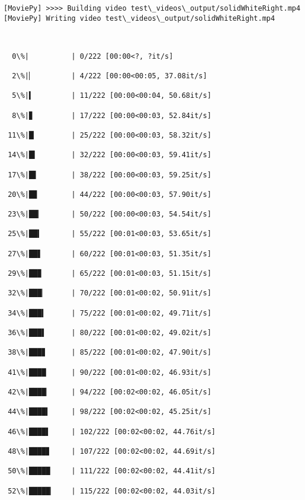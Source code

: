 \documentclass[11pt]{article}
\begin{document}
    \begin{Verbatim}[commandchars=\\\{\}]
[MoviePy] >>>> Building video test\_videos\_output/solidWhiteRight.mp4
[MoviePy] Writing video test\_videos\_output/solidWhiteRight.mp4

    \end{Verbatim}

    \begin{Verbatim}[commandchars=\\\{\}]


  0\%|          | 0/222 [00:00<?, ?it/s]

  2\%|▏         | 4/222 [00:00<00:05, 37.08it/s]

  5\%|▍         | 11/222 [00:00<00:04, 50.68it/s]

  8\%|▊         | 17/222 [00:00<00:03, 52.84it/s]

 11\%|█▏        | 25/222 [00:00<00:03, 58.32it/s]

 14\%|█▍        | 32/222 [00:00<00:03, 59.41it/s]

 17\%|█▋        | 38/222 [00:00<00:03, 59.25it/s]

 20\%|█▉        | 44/222 [00:00<00:03, 57.90it/s]

 23\%|██▎       | 50/222 [00:00<00:03, 54.54it/s]

 25\%|██▍       | 55/222 [00:01<00:03, 53.65it/s]

 27\%|██▋       | 60/222 [00:01<00:03, 51.35it/s]

 29\%|██▉       | 65/222 [00:01<00:03, 51.15it/s]

 32\%|███▏      | 70/222 [00:01<00:02, 50.91it/s]

 34\%|███▍      | 75/222 [00:01<00:02, 49.71it/s]

 36\%|███▌      | 80/222 [00:01<00:02, 49.02it/s]

 38\%|███▊      | 85/222 [00:01<00:02, 47.90it/s]

 41\%|████      | 90/222 [00:01<00:02, 46.93it/s]

 42\%|████▏     | 94/222 [00:02<00:02, 46.05it/s]

 44\%|████▍     | 98/222 [00:02<00:02, 45.25it/s]

 46\%|████▌     | 102/222 [00:02<00:02, 44.76it/s]

 48\%|████▊     | 107/222 [00:02<00:02, 44.69it/s]

 50\%|█████     | 111/222 [00:02<00:02, 44.41it/s]

 52\%|█████▏    | 115/222 [00:02<00:02, 44.03it/s]


\end{Verbatim}
\end{document}
